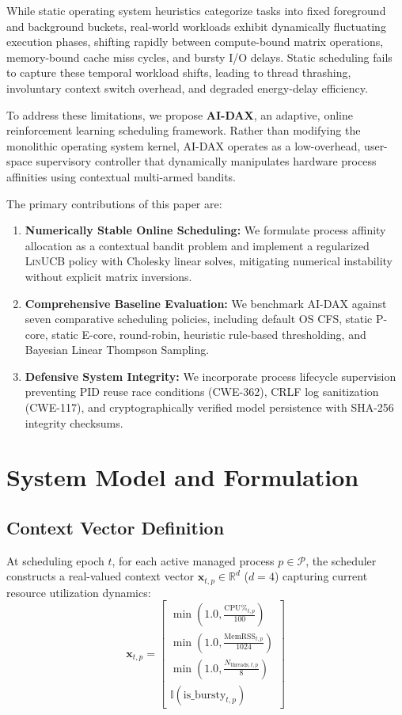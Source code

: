 \documentclass[conference]{IEEEtran}
\begin{document}
While static operating system heuristics categorize tasks into fixed foreground and background buckets, real-world workloads exhibit dynamically fluctuating execution phases, shifting rapidly between compute-bound matrix operations, memory-bound cache miss cycles, and bursty I/O delays. Static scheduling fails to capture these temporal workload shifts, leading to thread thrashing, involuntary context switch overhead, and degraded energy-delay efficiency.

To address these limitations, we propose \textbf{AI-DAX}, an adaptive, online reinforcement learning scheduling framework. Rather than modifying the monolithic operating system kernel, AI-DAX operates as a low-overhead, user-space supervisory controller that dynamically manipulates hardware process affinities using contextual multi-armed bandits.

The primary contributions of this paper are:
\begin{enumerate}
    \item \textbf{Numerically Stable Online Scheduling:} We formulate process affinity allocation as a contextual bandit problem and implement a regularized \textsc{LinUCB} policy with Cholesky linear solves, mitigating numerical instability without explicit matrix inversions.
    \item \textbf{Comprehensive Baseline Evaluation:} We benchmark AI-DAX against seven comparative scheduling policies, including default OS CFS, static P-core, static E-core, round-robin, heuristic rule-based thresholding, and Bayesian Linear Thompson Sampling.
    \item \textbf{Defensive System Integrity:} We incorporate process lifecycle supervision preventing PID reuse race conditions (CWE-362), CRLF log sanitization (CWE-117), and cryptographically verified model persistence with SHA-256 integrity checksums.
\end{enumerate}

\section{System Model and Formulation}

\subsection{Context Vector Definition}
At scheduling epoch $t$, for each active managed process $p \in \mathcal{P}$, the scheduler constructs a real-valued context vector $\mathbf{x}_{t,p} \in \mathbb{R}^d$ ($d=4$) capturing current resource utilization dynamics:
\begin{equation}
\mathbf{x}_{t,p} = \begin{bmatrix}
\min\left(1.0, \frac{\text{CPU}\%_{t,p}}{100}\right) \\
\min\left(1.0, \frac{\text{MemRSS}_{t,p}}{1024}\right) \\
\min\left(1.0, \frac{N_{\text{threads},t,p}}{8}\right) \\
\mathbb{I}(\text{is\_bursty}_{t,p})
\end{bmatrix}
\end{equation}
\end{document}
